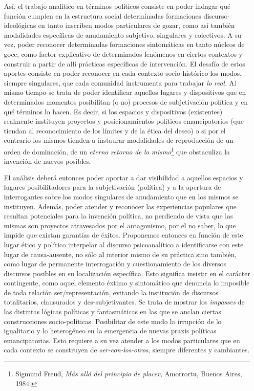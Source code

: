 Así, el trabajo analítico en términos políticos consiste en poder indagar qué función cumplen en la estructura social determinadas formaciones discurso-ideológicas en tanto inscriben modos particulares de gozar, como así también modalidades específicas de anudamiento subjetivo, singulares y colectivos. A su vez, poder reconocer determinadas formaciones sintomáticas en tanto núcleos de goce, como factor explicativo de determinados fenómenos en ciertos contextos y construir a partir de allí prácticas específicas de intervención. El desafío de estos aportes consiste en poder reconocer en cada contexto socio-histórico los modos, siempre singulares, que cada comunidad instrumenta para trabajar \emph{lo real.} Al mismo tiempo se trata de poder identificar aquellos lugares y dispositivos que en determinados momentos posibilitan (o no) procesos de subjetivación política y en qué términos lo hacen. Es decir, si los espacios y dispositivos (existentes) realmente instituyen proyectos y posicionamientos políticos emancipatorios (que tiendan al reconocimiento de los límites y de la ética del deseo) o si por el contrario los mismos tienden a instaurar modalidades de reproducción de un orden de dominación, de un \emph{eterno retorno de lo mismo}\footnote{Sigmund Freud, \emph{Más allá del principio de placer,} Amorrortu, Buenos Aires, 1984.} que obstaculiza la invención de nuevos posibles.

El análisis deberá entonces poder aportar a dar visibilidad a aquellos espacios y lugares posibilitadores para la subjetivación (política) y a la apertura de interrogantes sobre los modos singulares de anudamiento que en los mismos se instituyen. Además, poder atender y reconocer las experiencias populares que resultan potenciales para la invención política, no perdiendo de vista que las mismas son proyectos atravesados por el antagonismo, por el no saber, lo que impide que existan garantías de éxitos. Proponemos entonces en función de este lugar ético y político interpelar al discurso psicoanalítico a identificarse con este lugar de causa-ausente, no sólo al interior mismo de su práctica sino también, como lugar de permanente interrogación y cuestionamiento de los diversos discursos posibles en su localización específica. Esto significa insistir en el carácter contingente, como aquel elemento éxtimo y sintomático que denuncia lo imposible de toda relación ser/representación, evitando la institución de discursos totalitarios, clausurados y des-subjetivantes. Se trata de mostrar los \emph{impasses} de las distintas lógicas políticas y fantasmáticas en las que se anclan ciertas construcciones socio-políticas. Posibilitar de este modo la irrupción de lo igualitario y lo heterogéneo en la emergencia de nuevas praxis políticas emancipatorias. Esto requiere a su vez atender a los modos particulares que en cada contexto se construyen de \emph{ser-con-los-otros}, siempre diferentes y cambiantes.

